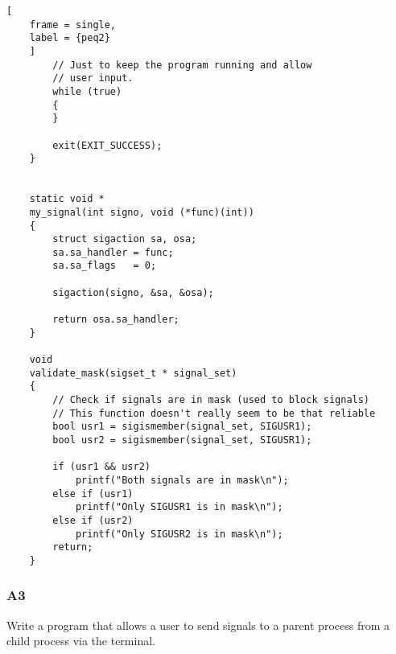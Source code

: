 \documentclass{article}
\begin{document}
\begin{lstlisting}[
    frame = single,
    label = {peq2}
    ]
        // Just to keep the program running and allow
        // user input.
        while (true)
        {
        }

        exit(EXIT_SUCCESS);
    }


    static void * 
    my_signal(int signo, void (*func)(int))
    {
        struct sigaction sa, osa;
        sa.sa_handler = func;
        sa.sa_flags   = 0;

        sigaction(signo, &sa, &osa);

        return osa.sa_handler;
    }

    void 
    validate_mask(sigset_t * signal_set)
    {
        // Check if signals are in mask (used to block signals)
        // This function doesn't really seem to be that reliable
        bool usr1 = sigismember(signal_set, SIGUSR1);
        bool usr2 = sigismember(signal_set, SIGUSR1);

        if (usr1 && usr2)
            printf("Both signals are in mask\n");
        else if (usr1)
            printf("Only SIGUSR1 is in mask\n");
        else if (usr2)
            printf("Only SIGUSR2 is in mask\n");
        return;
    }
\end{lstlisting}
\subsubsection{A3}
Write a program that allows a user to send signals to a parent process from a child
process via the terminal.
\end{document}
